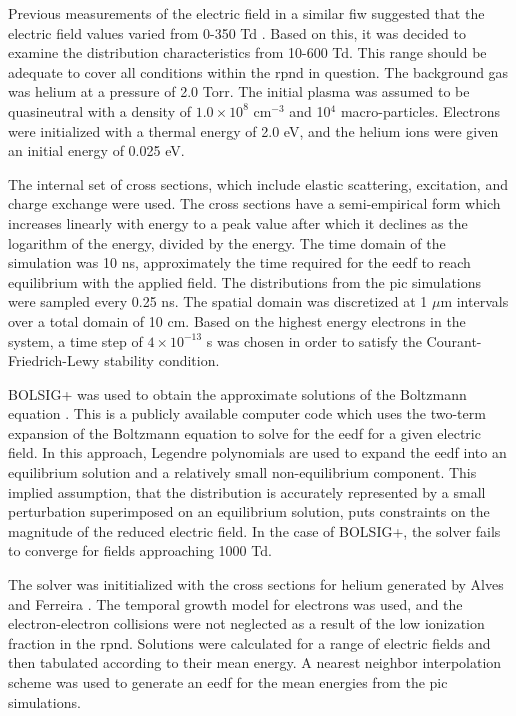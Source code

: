 Previous measurements of the electric field in a similar \acs{fiw} suggested
that the electric field values varied from 0-350 Td \cite{Takashima2011}. Based
on this, it was decided to examine the distribution characteristics from 10-600
Td. This range should be adequate to cover all conditions within the \acs{rpnd}
in question. The background gas was helium at a pressure of 2.0 Torr. The
initial plasma was assumed to be quasineutral with a density of
$1.0\times10^{8}$ cm$^{-3}$ and 10$^4$ macro-particles. Electrons were
initialized with a thermal energy of 2.0 eV, and the helium ions were given an
initial energy of 0.025 eV. 

The internal set of cross sections, which include elastic scattering,
excitation, and charge exchange were used. The cross sections have a
semi-empirical form which increases linearly with energy to a peak value after
which it declines as the logarithm of the energy, divided by the energy. The
time domain of the simulation was 10 ns, approximately the time required for the
\acs{eedf} to reach equilibrium with the applied field. The distributions from
the \acs{pic} simulations were sampled every 0.25 ns. The spatial domain was
discretized at 1 $\mu$m intervals over a total domain of 10 cm. Based on the
highest energy electrons in the system, a time step of $4\times10^{-13}$ s was
chosen in order to satisfy the Courant-Friedrich-Lewy stability condition.

BOLSIG+ was used to obtain the approximate solutions of the Boltzmann equation
\cite{Hagelaar2005}. This is a publicly available computer code which uses the
two-term expansion of the Boltzmann equation to solve for the \acs{eedf} for a
given electric field. In this approach, Legendre polynomials are used to expand
the \acs{eedf} into an equilibrium solution and a relatively small
non-equilibrium component. This implied assumption, that the distribution is
accurately represented by a small perturbation superimposed on an equilibrium
solution, puts constraints on the magnitude of the reduced electric field. In
the case of BOLSIG+, the solver fails to converge for fields approaching 1000
Td.

The solver was inititialized with the cross sections for helium generated by
Alves and Ferreira \cite{Alves2013}. The temporal growth model for electrons was
used, and the electron-electron collisions were not neglected as a result of the
low ionization fraction in the \acs{rpnd}. Solutions were calculated for a range
of electric fields and then tabulated according to their mean energy. A nearest
neighbor interpolation scheme was used to generate an \acs{eedf} for the mean
energies from the \acs{pic} simulations.


